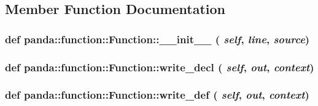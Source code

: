 \subsection{Member Function Documentation}
\hypertarget{classpanda_1_1function_1_1Function_ab05763e0a9f1cad4448e3a25b8eeb5ea}{
\subsubsection[{\_\-\_\-init\_\-\_\-}]{\setlength{\rightskip}{0pt plus 5cm}def panda::function::Function::\_\-\_\-init\_\-\_\- ( {\em self}, \/   {\em line}, \/   {\em source})}}
\label{classpanda_1_1function_1_1Function_ab05763e0a9f1cad4448e3a25b8eeb5ea}
\hypertarget{classpanda_1_1function_1_1Function_a9edad45bf9b4b97213cf4a3c672fbfe1}{
\subsubsection[{write\_\-decl}]{\setlength{\rightskip}{0pt plus 5cm}def panda::function::Function::write\_\-decl ( {\em self}, \/   {\em out}, \/   {\em context})}}
\label{classpanda_1_1function_1_1Function_a9edad45bf9b4b97213cf4a3c672fbfe1}
\hypertarget{classpanda_1_1function_1_1Function_a3e2c8cb654f087fa2e3efc6788b694b2}{
\subsubsection[{write\_\-def}]{\setlength{\rightskip}{0pt plus 5cm}def panda::function::Function::write\_\-def ( {\em self}, \/   {\em out}, \/   {\em context})}}
\label{classpanda_1_1function_1_1Function_a3e2c8cb654f087fa2e3efc6788b694b2}


